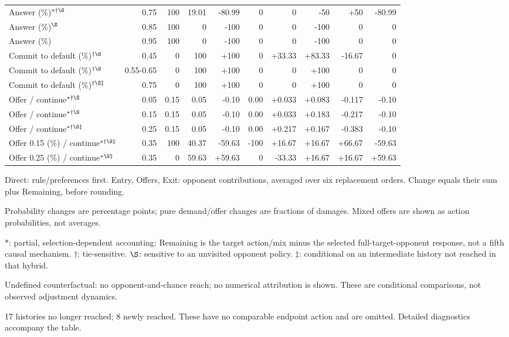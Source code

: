 \documentclass[10pt]{article}
\begin{document}
{\begin{longtable}{@{}>{\raggedright\arraybackslash}p{1.65in}rrrrrrrrr@{}}
Answer (\%)$^{*\dagger\S}$ & 0.75 & 100 & 19.01 & -80.99 & 0 & 0 & -50 & +50 & -80.99\\
Answer (\%)$^{\S}$ & 0.85 & 100 & 0 & -100 & 0 & 0 & -100 & 0 & 0\\
Answer (\%) & 0.95 & 100 & 0 & -100 & 0 & 0 & -100 & 0 & 0\\
Commit to default (\%)$^{\dagger\S}$ & 0.45 & 0 & 100 & +100 & 0 & +33.33 & +83.33 & -16.67 & 0\\
Commit to default (\%)$^{\dagger\S}$ & 0.55-0.65 & 0 & 100 & +100 & 0 & 0 & +100 & 0 & 0\\
Commit to default (\%)$^{\dagger\S\ddagger}$ & 0.75 & 0 & 100 & +100 & 0 & 0 & +100 & 0 & 0\\
Offer / continue$^{*\dagger\S}$ & 0.05 & 0.15 & 0.05 & -0.10 & 0.00 & +0.033 & +0.083 & -0.117 & -0.10\\
Offer / continue$^{*\dagger\S}$ & 0.15 & 0.15 & 0.05 & -0.10 & 0.00 & +0.033 & +0.183 & -0.217 & -0.10\\
Offer / continue$^{*\dagger\S\ddagger}$ & 0.25 & 0.15 & 0.05 & -0.10 & 0.00 & +0.217 & +0.167 & -0.383 & -0.10\\
Offer 0.15 (\%) / continue$^{*\dagger\S\ddagger}$ & 0.35 & 100 & 40.37 & -59.63 & -100 & +16.67 & +16.67 & +66.67 & -59.63\\
Offer 0.25 (\%) / continue$^{*\S\ddagger}$ & 0.35 & 0 & 59.63 & +59.63 & 0 & -33.33 & +16.67 & +16.67 & +59.63\\
\end{longtable}}
{\footnotesize Direct: rule/preferences first. Entry, Offers, Exit: opponent contributions, averaged over six replacement orders. Change equals their sum plus Remaining, before rounding.\par
Probability changes are percentage points; pure demand/offer changes are fractions of damages. Mixed offers are shown as action probabilities, not averages.\par
$*$: partial, selection-dependent accounting; Remaining is the target action/mix minus the selected full-target-opponent response, not a fifth causal mechanism. $\dagger$: tie-sensitive. $\S$: sensitive to an unvisited opponent policy. $\ddagger$: conditional on an intermediate history not reached in that hybrid.\par
Undefined counterfactual: no opponent-and-chance reach; no numerical attribution is shown. These are conditional comparisons, not observed adjustment dynamics.\par
17 histories no longer reached; 8 newly reached. These have no comparable endpoint action and are omitted. Detailed diagnostics accompany the table.}\par
\end{document}
